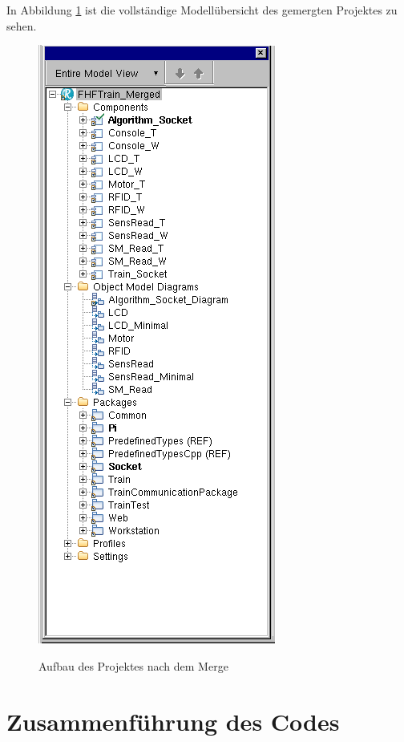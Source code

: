 In Abbildung \ref{pic:train_structure_merged} ist die vollständige Modellübersicht des gemergten Projektes zu sehen.
\begin{figure}
	\caption{Aufbau des Projektes nach dem Merge}
	\includegraphics[height=0.8\textheight]{content/pictures/train/structure_merged.png}
	\label{pic:train_structure_merged}
\end{figure}

\section{Zusammenführung des Codes}

